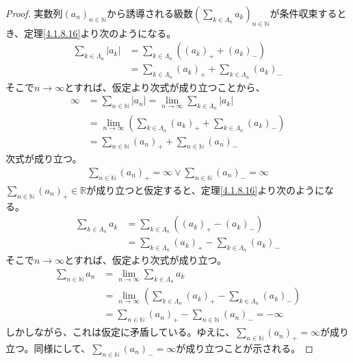 \documentclass[dvipdfmx]{jsarticle}
\begin{document}
\begin{proof}
実数列$\left( a_{n} \right)_{n \in \mathbb{N}}$から誘導される級数$\left( \sum_{k \in \varLambda_{n}} a_{k} \right)_{n \in \mathbb{N}}$が条件収束するとき、定理\ref{4.1.8.16}より次のようになる。
\begin{align*}
\sum_{k \in \varLambda_{n}} \left| a_{k} \right| &= \sum_{k \in \varLambda_{n}} \left( \left( a_{k} \right)_{+} + \left( a_{k} \right)_{-} \right)\\
&= \sum_{k \in \varLambda_{n}} \left( a_{k} \right)_{+} + \sum_{k \in \varLambda_{n}} \left( a_{k} \right)_{-}
\end{align*}
そこで$n \rightarrow \infty$とすれば、仮定より次式が成り立つことから、
\begin{align*}
\infty &= \sum_{n \in \mathbb{N}} \left| a_{n} \right| = \lim_{n \rightarrow \infty}{\sum_{k \in \varLambda_{n}} \left| a_{k} \right|}\\
&= \lim_{n \rightarrow \infty}\left( \sum_{k \in \varLambda_{n}} \left( a_{k} \right)_{+} + \sum_{k \in \varLambda_{n}} \left( a_{k} \right)_{-} \right)\\
&= \sum_{n \in \mathbb{N}} \left( a_{n} \right)_{+} + \sum_{n \in \mathbb{N}} \left( a_{n} \right)_{-}
\end{align*}
次式が成り立つ。
\begin{align*}
\sum_{n \in \mathbb{N}} \left( a_{n} \right)_{+} = \infty \vee \sum_{n \in \mathbb{N}} \left( a_{n} \right)_{-} = \infty
\end{align*}
$\sum_{n \in \mathbb{N}} \left( a_{n} \right)_{+} \in \mathbb{R}$が成り立つと仮定すると、定理\ref{4.1.8.16}より次のようになる。
\begin{align*}
\sum_{k \in \varLambda_{n}} a_{k} &= \sum_{k \in \varLambda_{n}} \left( \left( a_{k} \right)_{+} - \left( a_{k} \right)_{-} \right)\\
&= \sum_{k \in \varLambda_{n}} \left( a_{k} \right)_{+} - \sum_{k \in \varLambda_{n}} \left( a_{k} \right)_{-}
\end{align*}
そこで$n \rightarrow \infty$とすれば、仮定より次式が成り立つ。
\begin{align*}
\sum_{n \in \mathbb{N}} a_{n} &= \lim_{n \rightarrow \infty}{\sum_{k \in \varLambda_{n}} a_{k}}\\
&= \lim_{n \rightarrow \infty}\left( \sum_{k \in \varLambda_{n}} \left( a_{k} \right)_{+} - \sum_{k \in \varLambda_{n}} \left( a_{k} \right)_{-} \right)\\
&= \sum_{n \in \mathbb{N}} \left( a_{n} \right)_{+} - \sum_{n \in \mathbb{N}} \left( a_{n} \right)_{-} = - \infty
\end{align*}
しかしながら、これは仮定に矛盾している。ゆえに、$\sum_{n \in \mathbb{N}} \left( a_{n} \right)_{+} = \infty$が成り立つ。同様にして、$\sum_{n \in \mathbb{N}} \left( a_{n} \right)_{-} = \infty$が成り立つことが示される。
\end{proof}
\end{document}

